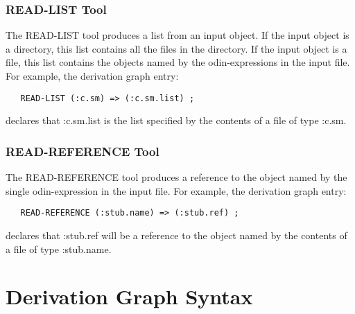 \subsection{READ-LIST Tool}

The {\ex READ-LIST} tool produces a list from an input object.
If the input object is a directory, this list contains all the files in
the directory.
If the input object is a file, this list contains
the objects named by the odin-expressions in the input file.
For example, the derivation graph entry:
\begin{verbatim}
   READ-LIST (:c.sm) => (:c.sm.list) ;
\end{verbatim}
declares that {\ex :c.sm.list} is the list specified by the contents of
a file of type {\ex :c.sm}.

\subsection{READ-REFERENCE Tool}

The {\ex READ-REFERENCE} tool produces a reference to
the object named by the single odin-expression in the input file.
For example, the derivation graph entry:
\begin{verbatim}
   READ-REFERENCE (:stub.name) => (:stub.ref) ;
\end{verbatim}
declares that {\ex :stub.ref} will be a reference
to the object named by the contents of
a file of type {\ex :stub.name}.


\chapter{Derivation Graph Syntax}

